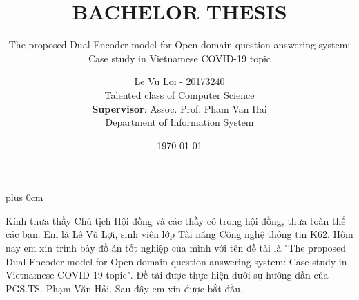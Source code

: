 \documentclass[11pt]{beamer}
\renewcommand{\raggedright}{\leftskip=0pt \rightskip=0pt plus 0cm}
\let\olditemize=\itemize
\renewenvironment{itemize}{\olditemize\raggedright}{\endlist}
\def\mydate{\leavevmode\hbox{\bfseries\the\day/\twodigits\month/\twodigits\year}}
\def\twodigits#1{\ifnum#1<10 0\fi\the#1}
\begin{document}
\captionsenglish
\dateUSenglish
\author[Le Vu Loi]{
	\begin{center}
		{\fontsize{14pt}{\baselineskip}\selectfont Le Vu Loi - 20173240} \\[10pt]
		{\fontsize{12pt}{\baselineskip}\selectfont Talented class of Computer Science} \\[25pt]
		\textbf{Supervisor}: Assoc. Prof. Pham Van Hai\\
		Department of Information System
	\end{center}
}
\title[]{\bfseries\fontsize{14}{\baselineskip}\selectfont BACHELOR THESIS\vspace{5pt}}
\subtitle{The proposed Dual Encoder model for Open-domain
	question answering system: Case study in Vietnamese
	COVID-19 topic}
\date[\mydate]{\today}
\begin{frame}[plain]
	\maketitle
\end{frame}
\begin{frame}[plain]
\begin{itemize}
	\item Kính thưa thầy Chủ tịch Hội đồng và các thầy cô trong hội đồng, thưa toàn thể các bạn. Em là Lê Vũ Lợi, sinh viên lớp Tài năng Công nghệ thông tin K62. Hôm nay em xin trình bày đồ án tốt nghiệp của mình với tên đề tài là "The proposed Dual Encoder model for Open-domain question answering system: Case study in Vietnamese COVID-19 topic". Đề tài được thực hiện dưới sự hướng dẫn của PGS.TS. Phạm Văn Hải. Sau đây em xin được bắt đầu.
\end{itemize}
\end{frame}
\end{document}
